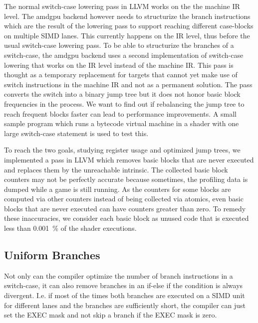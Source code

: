 The normal switch-case lowering pass in LLVM works on the the machine IR level.
The amdgpu backend however needs to structurize the branch instructions which are the result of the lowering pass to support reaching different case-blocks on multiple SIMD lanes.
This currently happens on the IR level, thus before the usual switch-case lowering pass.
To be able to structurize the branches of a switch-case, the amdgpu backend uses a second implementation of switch-case lowering that works on the IR level instead of the machine IR.
This pass is thought as a temporary replacement for targets that cannot yet make use of switch instructions in the machine IR and not as a permanent solution.
The pass converts the switch into a binary jump tree but it does not honor basic block frequencies in the process.
We want to find out if rebalancing the jump tree to reach frequent blocks faster can lead to performance improvements.
A small sample program which runs a bytecode virtual machine in a shader with one large switch-case statement is used to test this.

To reach the two goals, studying register usage and optimized jump trees, we implemented a pass in LLVM which removes basic blocks that are never executed and replaces them by the unreachable intrinsic.
The collected basic block counters may not be perfectly accurate because sometimes, the profiling data is dumped while a game is still running.
As the counters for some blocks are computed via other counters instead of being collected via atomics, even basic blocks that are never executed can have counters greater than zero.
To remedy these inaccuracies, we consider each basic block as unused code that is executed less than \SI{0.001}{\percent} of the shader executions.

\subsection{Uniform Branches}
\label{sub:uniformity_branch}
Not only can the compiler optimize the number of branch instructions in a switch-case, it can also remove branches in an if-else if the condition is always divergent.
I.e. if most of the times both branches are executed on a SIMD unit for different lanes and the branches are sufficiently short, the compiler can just set the EXEC mask and not skip a branch if the EXEC mask is zero.


